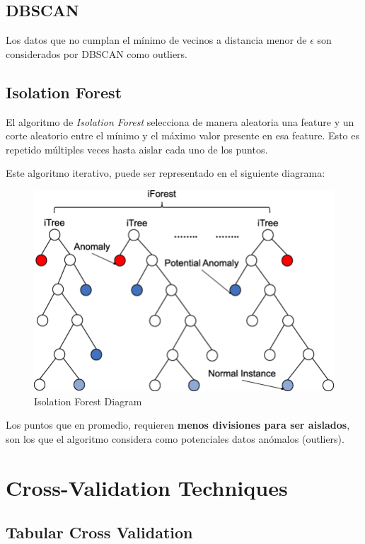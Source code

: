 \subsection{DBSCAN}

Los datos que no cumplan el mínimo de vecinos a distancia menor de $\epsilon$ son considerados por DBSCAN como outliers.

\subsection{Isolation Forest}

El algoritmo de \textit{Isolation Forest} selecciona de manera aleatoria una feature y un corte aleatorio entre el mínimo y el máximo valor presente en esa feature. Esto es repetido múltiples veces hasta aislar cada uno de los puntos.

Este algoritmo iterativo, puede ser representado en el siguiente diagrama:

\begin{figure}[H]
    \center
    \includegraphics[scale=0.3]{notebooks/Others/img/isolation_forest_diagram.png}
    \caption{Isolation Forest Diagram}
\end{figure}

Los puntos que en promedio, requieren \textbf{menos divisiones para ser aislados}, son los que el algoritmo considera como potenciales datos anómalos (outliers).

\section{Cross-Validation Techniques}

\subsection{Tabular Cross Validation}

